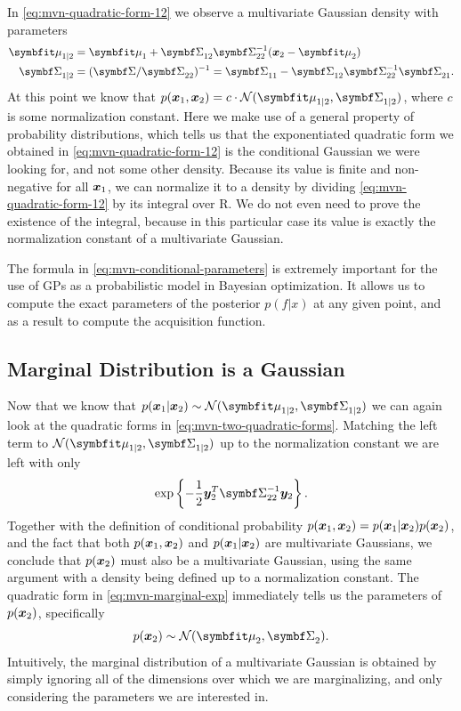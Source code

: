In \autoref{eq:mvn-quadratic-form-12} we observe a multivariate Gaussian density with
parameters
\begin{align}
  \vmu_{1|2} &= \vmu_1 + \mSigma_{12}\mSigma_{22}^{-1} (\vx_2 - \vmu_2) \\
  \mSigma_{1|2} &= (\mSigma/\mSigma_{22})^{-1} =  \ms{11} - \ms{12} \mSigma_{22}^{-1} \ms{21}.
  \label{eq:mvn-conditional-parameters}
\end{align}
At this point we know that $p(\vx_1, \vx_2) = c \cdot \mathcal{N}(\vmu_{1|2}, \mSigma_{1|2})$, where $c$ is some normalization constant. Here we make use of a general property of probability distributions, which tells us that the exponentiated quadratic form we obtained in \autoref{eq:mvn-quadratic-form-12} is the conditional Gaussian we were looking for, and not some other density. Because its value is finite and non-negative for all ${\boldsymbol{x}}_1$, we can normalize it to a density by dividing \autoref{eq:mvn-quadratic-form-12} by its integral over $\mathrm{R}$. We do not even need to prove the existence of the integral, because in this particular case its value is exactly the normalization constant of a multivariate Gaussian.

The formula in \autoref{eq:mvn-conditional-parameters} is extremely important for the use of GPs as a probabilistic
model in Bayesian optimization. It allows us to compute the exact
parameters of the posterior $p(f|x)$ at any given point, and as a result
to compute the acquisition function.

\subsection{Marginal Distribution is a Gaussian}

Now that we know that $p(\vx_1 | \vx_2) \sim \mathcal{N}(\vmu_{1|2}, \mSigma_{1|2})$ we can again look at the quadratic forms in \autoref{eq:mvn-two-quadratic-forms}. Matching the left term to $\mathcal{N}(\vmu_{1|2}, \mSigma_{1|2})$ up to the normalization constant we are left with only
$$
\exp \left\lbrace -\frac{1}{2} \vy_2^T \mSigma_{22}^{-1} \vy_2 \right\rbrace.
\label{eq:mvn-marginal-exp}
$$
Together with the definition of conditional probability $p({\boldsymbol{x}}_1, {\boldsymbol{x}}_2) = p({\boldsymbol{x}}_1 | {\boldsymbol{x}}_2) p({\boldsymbol{x}}_2)$, and the fact that both $p({\boldsymbol{x}}_1, {\boldsymbol{x}}_2)$ and $p({\boldsymbol{x}}_1 | {\boldsymbol{x}}_2)$ are multivariate Gaussians, we conclude that $p({\boldsymbol{x}}_2)$ must also be a multivariate Gaussian, using the same argument with a density being defined up to a normalization constant.
The quadratic form in \autoref{eq:mvn-marginal-exp} immediately tells us the parameters of $p({\boldsymbol{x}}_2)$, specifically
$$
	p(\vx_2) \sim \mathcal{N}(\vmu_2, \mSigma_2).
	\label{eq:mvn-marginal-parameters}
$$
Intuitively, the marginal distribution of a multivariate Gaussian is obtained by simply ignoring all of the dimensions over which we are marginalizing, and only considering the parameters we are interested in.



